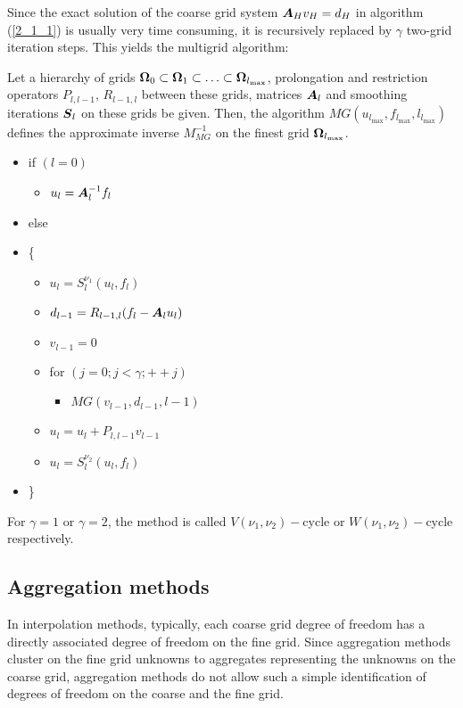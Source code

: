 Since the exact solution of the coarse grid system $\boldsymbol{A}_H v_H = d_H$ in
algorithm (\ref{2_1_1}) is usually very time consuming, it is recursively
replaced by $\gamma$ two-grid iteration steps. This yields the multigrid
algorithm:
\begin{algorithm}
Let a hierarchy of grids $\boldsymbol{\Omega}_0 \subset \boldsymbol{\Omega}_1 \subset \hdots \subset
\boldsymbol{\Omega}_{l_{\max}}$, prolongation and restriction operators $P_{l,l-1}$,
$R_{l-1,l}$ between these grids, matrices $\boldsymbol{A}_l$ and smoothing iterations
$\boldsymbol{S}_l$ on these grids be given. Then, the algorithm
$MG(u_{l_{\max}},f_{l_{\max}},l_{l_{\max}})$ defines the approximate inverse
$M_{MG}^{-1}$ on the finest grid $\boldsymbol{\Omega}_{l_{\max}}$.
\begin{itemize}
\item[] if $(l=0)$
\begin{itemize}
\item[] $u_l = \boldsymbol{A}_l^{-1} f_l$
\end{itemize}
\item[] else
\item[] \{
\begin{itemize}
\item[] $u_l=S_l^{\nu_1}(u_l,f_l)$
\item[] $d_{l-1} = R_{l-1,l}(f_l-\boldsymbol{A}_l u_l)$
\item[] $v_{l-1} = 0$
\item[] for $(j=0; j<\gamma;++j)$
\begin{itemize}
\item[] $MG (v_{l-1},d_{l-1},l-1)$
\end{itemize}
\item[] $u_l=u_l+P_{l,l-1} v_{l-1}$
\item[] $u_l=S_l^{\nu_2}(u_l,f_l)$
\end{itemize}
\item[] \}
\end{itemize}
\label{2_1_1}
\end{algorithm}
For $\gamma = 1$ or $\gamma = 2$, the method is called $V(\nu_1,\nu_2)-$cycle
or $W(\nu_1,\nu_2)-$cycle respectively. 
\subsection{Aggregation methods}
In interpolation methods, typically, each coarse grid degree of freedom has a
directly associated degree of freedom on the fine grid. Since aggregation
methods cluster on the fine grid unknowns to aggregates representing the
unknowns on the coarse grid, aggregation methods do not allow such a simple
identification of degrees of freedom on the coarse and the fine grid.

